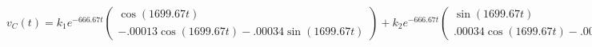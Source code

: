 \documentclass[preview]{standalone}
\begin{document}
\begin{center}
\[
                                        v_C(t) = k_1e^{-666.67t} 
                                        \begin{pmatrix} 
                                                \cos(1699.67t) \\ 
                                                -.00013\cos(1699.67t) - .00034\sin(1699.67t)
                                        \end{pmatrix} 
                                        + 
                                        k_2e^{-666.67t} 
                                        \begin{pmatrix} 
                                                \sin(1699.67t) \\ 
                                                .00034\cos(1699.67t) - .00013\sin(1699.67t)
                                        \end{pmatrix}
                                        \]
\end{center}
\end{document}
